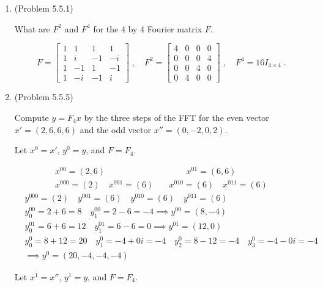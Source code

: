 \documentclass[a4paper]{article}
\begin{document}
\begin{enumerate}

\item{(Problem 5.5.1)}

What are $F^2$ and $F^4$ for the 4 by 4 Fourier matrix $F$. 

$$
F =
\begin{bmatrix}
1 & 1 & 1 & 1 \\
1 & i &  -1 & -i \\
1 & -1 & 1 & -1 \\
1 & -i & -1 & i
\end{bmatrix}
\;,\quad 
F^2 =
\begin{bmatrix}
4 & 0 & 0 & 0 \\
0 & 0 &  0 & 4 \\
0 & 0 & 4 & 0 \\
0 & 4 & 0 & 0
\end{bmatrix}
\;, \quad
F^4 = 16I_{4\times 4} \;.
$$

\item{(Problem 5.5.5)}

Compute $y = F_4x$ by the three steps of the FFT for the even vector $x' = (2,6,6,6)$ and the odd vector $x'' = (0,-2,0,2)$.

Let $x^0 = x'$, $y^0 = y$, and $F = F_4$.

\begin{align*}
x^{00} = (2,6)  \qquad \quad & \quad \qquad x^{01} = (6,6) \\
x^{000} = (2) \quad  x^{001} = (6) & \quad x^{010} = (6) \quad x^{011} = (6)
\end{align*}
\begin{align*}
& y^{000} = (2) \quad  y^{001} = (6) \quad y^{010} = (6) \quad y^{011} = (6) \\
& y^{00}_0 = 2 + 6 = 8 \quad y^{00}_1 = 2-6 = -4 \implies y^{00} = (8,-4) \\
& y^{01}_0 = 6 + 6 = 12 \quad y^{01}_1 = 6 - 6 = 0 \implies  y^{01} = (12,0) \\
&y^0_0 = 8 +12 = 20 \quad y^0_1 = -4 + 0i = -4 \quad y^0_2 = 8-12 = -4 \quad y^0_3 = -4-0i = -4 \\
& \implies y^0 = (20,-4,-4,-4)
\end{align*}

Let $x^1 = x''$, $y^1 = y$, and $F = F_4$.


\end{enumerate}
\end{document}
